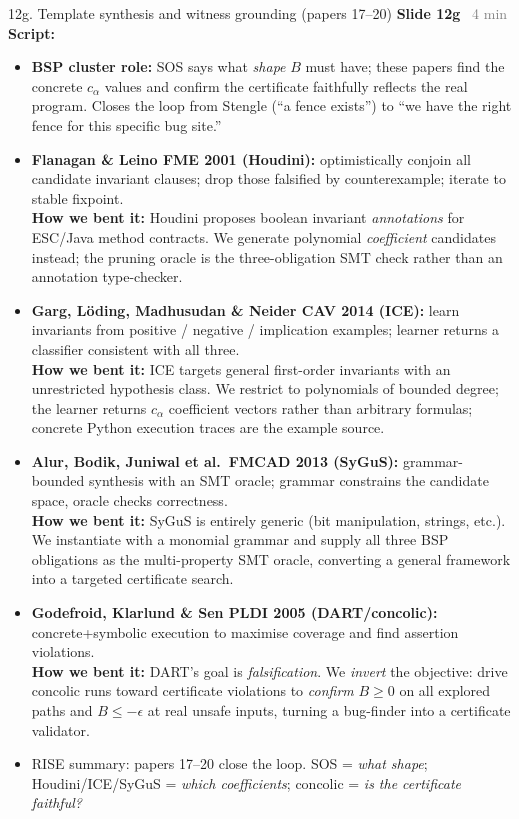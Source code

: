 \documentclass[aspectratio=169]{beamer}
\newcommand{\syncline}[2]{\textbf{#1} \hfill \textcolor{gray}{#2}}
\begin{document}
\begin{frame}[shrink=73]{12g. Template synthesis and witness grounding (papers 17--20)}
\syncline{Slide 12g}{~4 min}
\textbf{Script:}
\begin{itemize}
  \item \textbf{BSP cluster role:} SOS says what \emph{shape} \(B\) must have; these papers find the concrete \(c_\alpha\) values and confirm the certificate faithfully reflects the real program. Closes the loop from Stengle (``a fence exists'') to ``we have the right fence for this specific bug site.''
  \item \textbf{Flanagan \& Leino FME 2001 (Houdini):} optimistically conjoin all candidate invariant clauses; drop those falsified by counterexample; iterate to stable fixpoint.\\
    \textbf{How we bent it:} Houdini proposes boolean invariant \emph{annotations} for ESC/Java method contracts. We generate polynomial \emph{coefficient} candidates instead; the pruning oracle is the three-obligation SMT check rather than an annotation type-checker.
  \item \textbf{Garg, L\"oding, Madhusudan \& Neider CAV 2014 (ICE):} learn invariants from positive / negative / implication examples; learner returns a classifier consistent with all three.\\
    \textbf{How we bent it:} ICE targets general first-order invariants with an unrestricted hypothesis class. We restrict to polynomials of bounded degree; the learner returns \(c_\alpha\) coefficient vectors rather than arbitrary formulas; concrete Python execution traces are the example source.
  \item \textbf{Alur, Bodik, Juniwal et al.\ FMCAD 2013 (SyGuS):} grammar-bounded synthesis with an SMT oracle; grammar constrains the candidate space, oracle checks correctness.\\
    \textbf{How we bent it:} SyGuS is entirely generic (bit manipulation, strings, etc.). We instantiate with a monomial grammar and supply all three BSP obligations as the multi-property SMT oracle, converting a general framework into a targeted certificate search.
  \item \textbf{Godefroid, Klarlund \& Sen PLDI 2005 (DART/concolic):} concrete+symbolic execution to maximise coverage and find assertion violations.\\
    \textbf{How we bent it:} DART's goal is \emph{falsification}. We \emph{invert} the objective: drive concolic runs toward certificate violations to \emph{confirm} \(B\ge0\) on all explored paths and \(B\le-\epsilon\) at real unsafe inputs, turning a bug-finder into a certificate validator.
  \item RISE summary: papers 17--20 close the loop. SOS = \emph{what shape}; Houdini/ICE/SyGuS = \emph{which coefficients}; concolic = \emph{is the certificate faithful?}
\end{itemize}
\end{frame}
\end{document}
